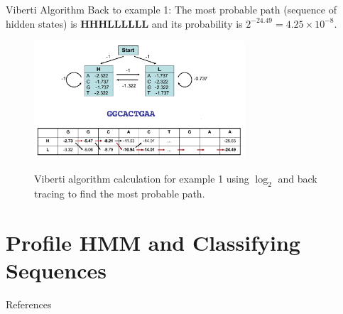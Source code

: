 \documentclass{beamer}
\begin{document}
\begin{frame}{Viberti Algorithm}
	Back to example 1: The most probable path (sequence of hidden states) is \textbf{HHHLLLLLL} and its probability is $2^{-24.49} = 4.25 \times 10^{-8}$.
	\begin{figure}
		\centering
		\includegraphics[width = 0.7\textwidth]{example1cal.png}
		\label{fig:example2cal}
		\caption{Viberti algorithm calculation for example 1 using $\log_2$ and back tracing to find the most probable path.}
	\end{figure}
\end{frame}

\section{Profile HMM and Classifying Sequences}

\begin{frame}{References}
	
	
\end{frame}
\end{document}
